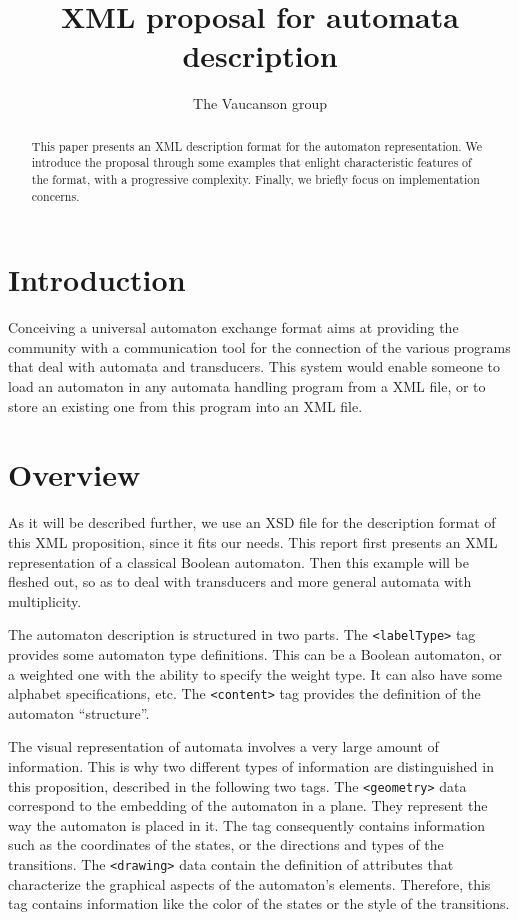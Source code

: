 \documentclass[a4paper]{article}
\newcommand{\Vauc}{{\sc Vaucanson}\xspace}
\newcommand{\xtag}[1]{\texttt{<#1>}}
\def\typetag{\xtag{labelType}}
\def\contenttag{\xtag{content}}
\def\geometrytag{\xtag{geometry}}
\def\drawingtag{\xtag{drawing}}
\begin{document}
\title{XML proposal for automata description}

\author{The \Vauc group}

\maketitle{}

\begin{abstract}
This paper presents an XML description format for the automaton
representation. We introduce the proposal through some examples that
enlight characteristic features of the format, with a progressive
complexity. Finally, we briefly focus on implementation concerns.
\end{abstract}

\section*{Introduction}

Conceiving a universal automaton exchange format aims at providing the
community with a communication tool for the connection
of the various programs that deal with automata and transducers.  This
system would enable someone to load an automaton in any automata
handling program from a XML file, or to store an existing one from
this program into an XML file.

\section{Overview}

As it will be described further, we use an XSD file \cite{vaucanson.www.xsd}
for the description format of this XML proposition, since it fits our needs.
This report first presents an XML representation of a classical Boolean
automaton. Then this example will be fleshed out, so as to deal with transducers
and more general automata with multiplicity.

The automaton description is structured in two parts.  The
\typetag{} tag provides some automaton type definitions. This can be a
Boolean automaton, or a weighted one with the ability to specify the
weight type.  It can also have some alphabet specifications, etc. The
\contenttag{} tag provides the definition of the automaton
``structure''.

The visual representation of automata involves a very large amount of
information. This is why two different types of information are
distinguished in this proposition, described in the following
two tags.  The \geometrytag{} data correspond to the embedding
of the automaton in a plane. They represent the way the automaton is
placed in it. The tag consequently contains information such as the
coordinates of the states, or the directions and types of the
transitions. The \drawingtag{} data contain the definition of
attributes that characterize the graphical aspects of the automaton's
elements. Therefore, this tag contains information like the color of
the states or the style of the transitions.
\end{document}
